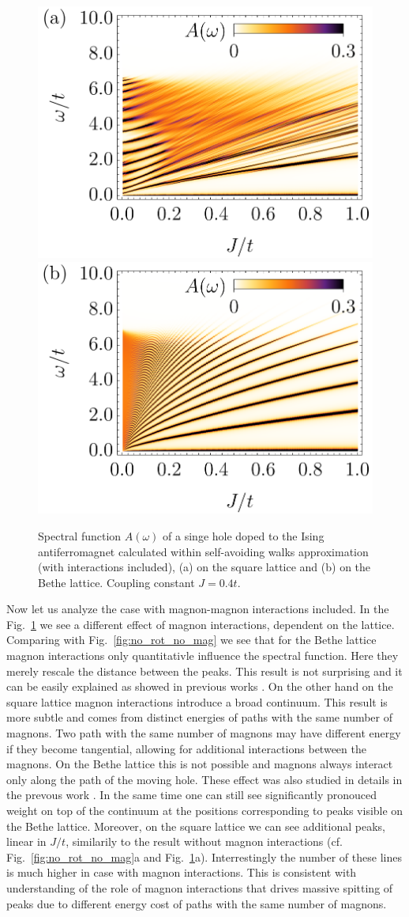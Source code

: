 \documentclass[%
 reprint,
 amsmath,amssymb,
 aps,
prb,
floatfix,
]{revtex4-1}
\begin{document}
\begin{figure}[ht!]
	\includegraphics[width=0.49\columnwidth]
	{./figures/square/Int64[].png}
	\includegraphics[width=0.49\columnwidth]
	{./figures/bethe/Int64[].png}
	\caption{
		Spectral function $A(\omega)$ of a singe hole doped to the Ising antiferromagnet calculated within self-avoiding walks approximation (with interactions included), (a) on the square lattice and (b) on the Bethe lattice. Coupling constant $J=0.4t$.
	}\label{fig:no_rot}
\end{figure}

Now let us analyze the case with magnon-magnon interactions included. In the Fig.~\ref{fig:no_rot} we see a different effect of magnon interactions, dependent on the lattice. Comparing with Fig.~\ref{fig:no_rot_no_mag} we see that for the Bethe lattice magnon interactions only quantitativle influence the spectral function. Here they merely rescale the distance between the peaks. This result is not surprising and it can be easily explained as showed in previous works . On the other hand on the square lattice magnon interactions introduce a broad continuum. This result is more subtle and comes from distinct energies of paths with the same number of magnons. Two path with the same number of magnons may have different energy if they become tangential, allowing for additional interactions between the magnons. On the Bethe lattice this is not possible and magnons always interact only along the path of the moving hole. These effect was also studied in details in the prevous work . In the same time one can still see significantly pronouced weight on top of the continuum at the positions corresponding to peaks visible on the Bethe lattice. Moreover, on the square lattice we can see additional peaks, linear in $J/t$, similarily to the result without magnon interactions (cf. Fig.~\ref{fig:no_rot_no_mag}a and Fig.~\ref{fig:no_rot}a). Interrestingly the number of these lines is much higher in case with magnon interactions. This is consistent with understanding of the role of magnon interactions that drives massive spitting of peaks due to different energy cost of paths with the same number of magnons.
\end{document}
